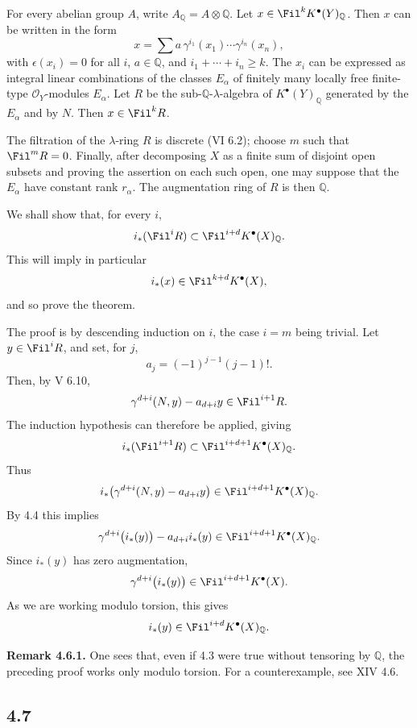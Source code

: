 For every abelian group \(A\), write \(A_{\mathbb Q}=A\otimes\mathbb Q\). Let \(x\in\Fil^kK^\bullet(Y)_{\mathbb Q}\). Then \(x\) can be written in the form
\[
  x=\sum a\,\gamma^{i_1}(x_1)\cdots\gamma^{i_n}(x_n),
\]
with \(\epsilon(x_i)=0\) for all \(i\), \(a\in\mathbb Q\), and \(i_1+\cdots+i_n\ge k\). The \(x_i\) can be expressed as integral linear combinations of the classes \(E_\alpha\) of finitely many locally free finite-type \(\mathcal O_Y\)-modules \(E_\alpha\). Let \(R\) be the sub-\(\mathbb Q\)-\(\lambda\)-algebra of \(K^\bullet(Y)_{\mathbb Q}\) generated by the \(E_\alpha\) and by \(N\). Then \(x\in\Fil^kR\).

The filtration of the \(\lambda\)-ring \(R\) is discrete (VI 6.2); choose \(m\) such that \(\Fil^mR=0\). Finally, after decomposing \(X\) as a finite sum of disjoint open subsets and proving the assertion on each such open, one may suppose that the \(E_\alpha\) have constant rank \(r_\alpha\). The augmentation ring of \(R\) is then \(\mathbb Q\).

We shall show that, for every \(i\),
\[
  i_*(\Fil^iR)\subset \Fil^{i+d}K^\bullet(X)_{\mathbb Q}.
\]
This will imply in particular
\[
  i_*(x)\in\Fil^{k+d}K^\bullet(X),
\]
and so prove the theorem.

The proof is by descending induction on \(i\), the case \(i=m\) being trivial. Let \(y\in\Fil^iR\), and set, for \(j\),
\[
  a_j=(-1)^{j-1}(j-1)!.
\]
Then, by V 6.10,
\[
  \gamma^{d+i}(N,y)-a_{d+i}y\in\Fil^{i+1}R.
\]
The induction hypothesis can therefore be applied, giving
\[
  i_*(\Fil^{i+1}R)\subset\Fil^{i+d+1}K^\bullet(X)_{\mathbb Q}.
\]
Thus
\[
  i_*\bigl(\gamma^{d+i}(N,y)-a_{d+i}y\bigr)
  \in\Fil^{i+d+1}K^\bullet(X)_{\mathbb Q}.
\]
By 4.4 this implies
\[
  \gamma^{d+i}\bigl(i_*(y)\bigr)-a_{d+i}i_*(y)
  \in\Fil^{i+d+1}K^\bullet(X)_{\mathbb Q}.
\]
Since \(i_*(y)\) has zero augmentation,
\[
  \gamma^{d+i}\bigl(i_*(y)\bigr)\in\Fil^{i+d+1}K^\bullet(X).
\]
As we are working modulo torsion, this gives
\[
  i_*(y)\in\Fil^{i+d}K^\bullet(X)_{\mathbb Q}.
\]

\textbf{Remark 4.6.1.} One sees that, even if 4.3 were true without tensoring by \(\mathbb Q\), the preceding proof works only modulo torsion. For a counterexample, see XIV 4.6.

\subsection*{4.7}

